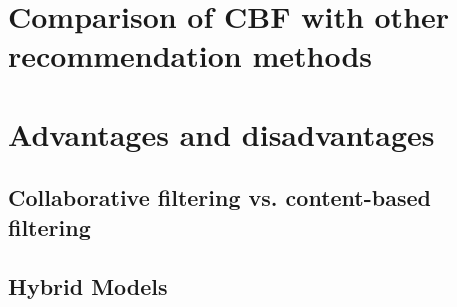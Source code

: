 \section{Comparison of CBF with other recommendation methods}\label{sec:cbf_comparison}

\section{Advantages and disadvantages} %

\subsection{Collaborative filtering vs. content-based filtering} %

\subsection{Hybrid Models} %
